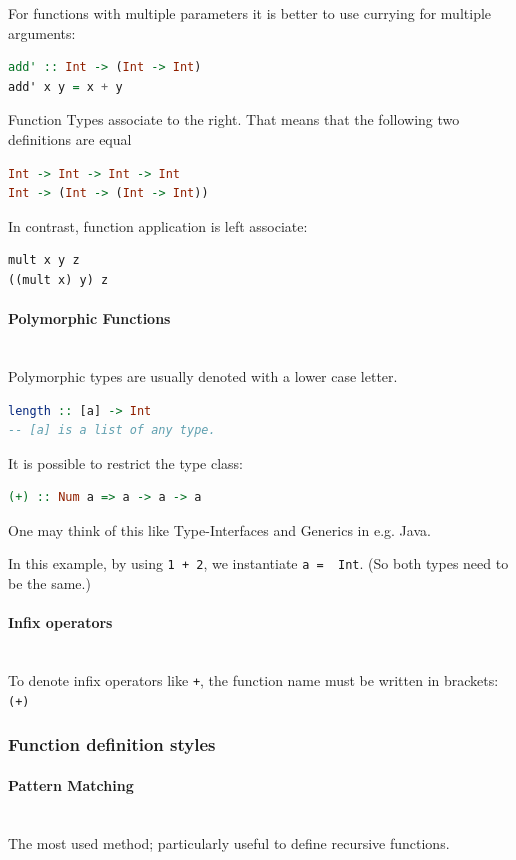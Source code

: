 For functions with multiple parameters it is better to use currying for multiple arguments:
\begin{lstlisting}[language=Haskell]
add' :: Int -> (Int -> Int)
add' x y = x + y
\end{lstlisting}

Function Types associate to the right. That means that the following two definitions are equal
\begin{lstlisting}[language=Haskell]
Int -> Int -> Int -> Int
Int -> (Int -> (Int -> Int))
\end{lstlisting}

In contrast, function application is left associate:
\begin{lstlisting}
mult x y z
((mult x) y) z
\end{lstlisting}


\paragraph{Polymorphic Functions} \hfill \\
Polymorphic types are usually denoted with a lower case letter.
\begin{lstlisting}[language=Haskell]
length :: [a] -> Int
-- [a] is a list of any type.
\end{lstlisting}

It is possible to restrict the type class:
\begin{lstlisting}[language=Haskell]
(+) :: Num a => a -> a -> a
\end{lstlisting}

One may think of this like Type-Interfaces and Generics in e.g. Java.

In this example, by using \lstinline|1 + 2|, we instantiate \lstinline|a =  Int|. (So both types need to be the same.)

\paragraph{Infix operators} \hfill \\

To denote infix operators like \lstinline|+|, the function name must be written in brackets: \lstinline|(+)|

\subsubsection{Function definition styles}

\paragraph{Pattern Matching} \hfill \\
The most used method; particularly useful to define recursive functions.

